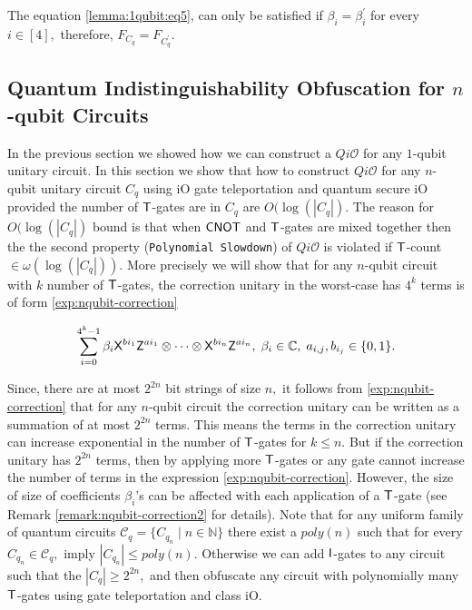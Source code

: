 The equation \ref{lemma:1qubit:eq5},  can only be satisfied if $\beta_i = \beta_i^\prime$ for every $i\in[4],$ therefore,  $F_{C_q}=F_{C_q^\prime}.$


\subsection{Quantum Indistinguishability Obfuscation for $n$-qubit Circuits}
In the previous section we showed how we can construct a $Qi\mathcal{O}$  for any $1$-qubit unitary circuit. In this section we show that how to construct  $Qi\mathcal{O}$ for any $n$-qubit unitary circuit $C_q$ using iO gate teleportation and quantum secure iO provided the number of ${\sf T}$-gates are in $C_q$ are $O(\log(|C_q|).$  The reason for $O(\log(|C_q|)$ bound is that when ${\sf CNOT}$ and ${\sf T}$-gates are mixed together then the
the second property ({\tt Polynomial Slowdown}) of $Qi\mathcal{O}$ is violated if ${\sf T}$-count $\in \omega(\log(|C_q|)).$ More precisely we will show that for any $n$-qubit circuit with $k$ number of ${\sf T}$-gates,  the correction unitary in the worst-case has $4^k$ terms is of form  \ref{exp:nqubit-correction} 

\begin{equation}
\label{exp:nqubit-correction}
\sum_{i=0}^{4^k-1} \beta_i {\sf X}^{b{i_1}} {\sf Z}^{a{i_1}}\otimes \cdots \otimes {\sf X}^{b{i_n}} {\sf Z}^{a{i_n}},\; \beta_i\in\mathbb{C},\; a_{i,j},b_{i_j}\in\{0,1\}.
\end{equation}

Since, there are at most $2^{2n}$ bit strings of size $n,$ it follows from  \ref{exp:nqubit-correction} that for any $n$-qubit circuit the correction unitary can be written as a summation of at most $2^{2n}$ terms. This means the terms in the correction unitary can increase exponential in the number of ${\sf T}$-gates for $k\leq n.$ But if the correction unitary has $2^{2n}$ terms, then by applying more ${\sf T}$-gates or any gate cannot increase the number of terms in the expression \ref{exp:nqubit-correction}. However,  the size of size of coefficients $\beta_i$'s can be affected with each application of a ${\sf T}$-gate (see Remark \ref{remark:nqubit-correction2} for details). Note that for any uniform family of quantum circuits 
$\mathcal{C}_q=\{C_{q_n}\mid n\in \mathbb{N}\}$ there exist a $poly(n)$ such that for every $C_{q_n}\in \mathcal{C}_q,$ imply $|C_{q_n}|\leq poly(n).$ Otherwise we can add ${\sf I}$-gates to any circuit such that the $|C_q|\geq 2^{2n},$ and then obfuscate any circuit with polynomially many ${\sf T}$-gates using gate teleportation and class iO.



